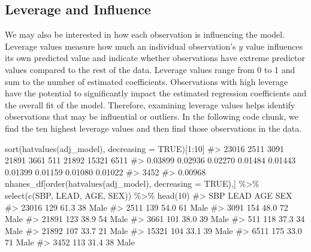 \documentclass[
  letterpaper,
]{latex/krantz}
\makeatletter
\newenvironment{Shaded}{\begin{snugshade}}{\end{snugshade}}
\newcommand{\AttributeTok}[1]{\textcolor[rgb]{0.40,0.45,0.13}{#1}}
\newcommand{\CommentTok}[1]{\textcolor[rgb]{0.37,0.37,0.37}{#1}}
\newcommand{\ConstantTok}[1]{\textcolor[rgb]{0.56,0.35,0.01}{#1}}
\newcommand{\DecValTok}[1]{\textcolor[rgb]{0.68,0.00,0.00}{#1}}
\newcommand{\FunctionTok}[1]{\textcolor[rgb]{0.28,0.35,0.67}{#1}}
\newcommand{\NormalTok}[1]{\textcolor[rgb]{0.00,0.23,0.31}{#1}}
\newcommand{\SpecialCharTok}[1]{\textcolor[rgb]{0.37,0.37,0.37}{#1}}
\newenvironment{kframe}{%
\medskip{}
\setlength{\fboxsep}{.8em}
 \def\at@end@of@kframe{}%
 \ifinner\ifhmode%
  \def\at@end@of@kframe{\end{minipage}}%
  \begin{minipage}{\columnwidth}%
 \fi\fi%
 \def\FrameCommand##1{\hskip\@totalleftmargin \hskip-\fboxsep
 \colorbox{shadecolor}{##1}\hskip-\fboxsep
     \hskip-\linewidth \hskip-\@totalleftmargin \hskip\columnwidth}%
 \MakeFramed {\advance\hsize-\width
   \@totalleftmargin\z@ \linewidth\hsize
   \@setminipage}}%
 {\par\unskip\endMakeFramed%
 \at@end@of@kframe}
\renewenvironment{Shaded}{\begin{kframe}}{\end{kframe}}
\makeatother
\begin{document}
\subsection{\texorpdfstring{Leverage and Influence
}{Leverage and Influence  }}\label{leverage-and-influence}

We may also be interested in how each observation is influencing the
model. Leverage values measure how much an individual observation's
\(y\) value influences its own predicted value and indicate whether
observations have extreme predictor values compared to the rest of the
data. Leverage values range from 0 to 1 and sum to the number of
estimated coefficients. Observations with high leverage have the
potential to significantly impact the estimated regression coefficients
and the overall fit of the model. Therefore, examining leverage values
helps identify observations that may be influential or outliers. In the
following code chunk, we find the ten highest leverage values and then
find those observations in the data.

\begin{Shaded}
\begin{Highlighting}[]
\FunctionTok{sort}\NormalTok{(}\FunctionTok{hatvalues}\NormalTok{(adj\_model), }\AttributeTok{decreasing =} \ConstantTok{TRUE}\NormalTok{)[}\DecValTok{1}\SpecialCharTok{:}\DecValTok{10}\NormalTok{]}
\CommentTok{\#\textgreater{}   23016    2511    3091   21891    3661     511   21892   15321    6511 }
\CommentTok{\#\textgreater{} 0.03899 0.02936 0.02270 0.01484 0.01443 0.01399 0.01159 0.01080 0.01022 }
\CommentTok{\#\textgreater{}    3452 }
\CommentTok{\#\textgreater{} 0.00968}
\NormalTok{nhanes\_df[}\FunctionTok{order}\NormalTok{(}\FunctionTok{hatvalues}\NormalTok{(adj\_model), }\AttributeTok{decreasing =} \ConstantTok{TRUE}\NormalTok{),] }\SpecialCharTok{\%\textgreater{}\%} 
  \FunctionTok{select}\NormalTok{(}\FunctionTok{c}\NormalTok{(SBP, LEAD, AGE, SEX)) }\SpecialCharTok{\%\textgreater{}\%} 
  \FunctionTok{head}\NormalTok{(}\DecValTok{10}\NormalTok{)}
\CommentTok{\#\textgreater{}       SBP LEAD AGE  SEX}
\CommentTok{\#\textgreater{} 23016 129 61.3  38 Male}
\CommentTok{\#\textgreater{} 2511  139 54.0  61 Male}
\CommentTok{\#\textgreater{} 3091  154 48.0  72 Male}
\CommentTok{\#\textgreater{} 21891 123 38.9  54 Male}
\CommentTok{\#\textgreater{} 3661  101 38.0  39 Male}
\CommentTok{\#\textgreater{} 511   118 37.3  34 Male}
\CommentTok{\#\textgreater{} 21892 107 33.7  21 Male}
\CommentTok{\#\textgreater{} 15321 104 33.1  39 Male}
\CommentTok{\#\textgreater{} 6511  175 33.0  71 Male}
\CommentTok{\#\textgreater{} 3452  113 31.4  38 Male}
\end{Highlighting}
\end{Shaded}
\end{document}
